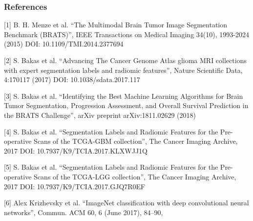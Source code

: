 \documentclass[../presentation.tex]{subfiles} %
\begin{document}
\begin{frame}

    \frametitle{References}

	{\fontsize{8pt}{7.2}\selectfont

    [1] B. H. Menze et al. ``The Multimodal Brain Tumor Image Segmentation Benchmark (BRATS)'', IEEE Transactions on Medical Imaging 34(10), 1993-2024 (2015) DOI: 10.1109/TMI.2014.2377694\\
	\vspace{1em}

    [2] S. Bakas et al. ``Advancing The Cancer Genome Atlas glioma MRI collections with expert segmentation labels and radiomic features'', Nature Scientific Data, 4:170117 (2017) DOI: 10.1038/sdata.2017.117\\
	\vspace{1em}

    [3] S. Bakas et al. ``Identifying the Best Machine Learning Algorithms for Brain Tumor Segmentation, Progression Assessment, and Overall Survival Prediction in the BRATS Challenge'', arXiv preprint arXiv:1811.02629 (2018)\\
	\vspace{1em}

    [4] S. Bakas et al. ``Segmentation Labels and Radiomic Features for the Pre-operative Scans of the TCGA-GBM collection'', The Cancer Imaging Archive, 2017 DOI: 10.7937/K9/TCIA.2017.KLXWJJ1Q\\
	\vspace{1em}

    [5] S. Bakas et al. ``Segmentation Labels and Radiomic Features for the Pre-operative Scans of the TCGA-LGG collection'', The Cancer Imaging Archive, 2017 DOI: 10.7937/K9/TCIA.2017.GJQ7R0EF\\
	\vspace{1em}

    [6] Alex Krizhevsky et al. ``ImageNet classification with deep convolutional neural networks'', Commun. ACM 60, 6 (June 2017), 84--90, \\
	}

\end{frame}
\end{document}
